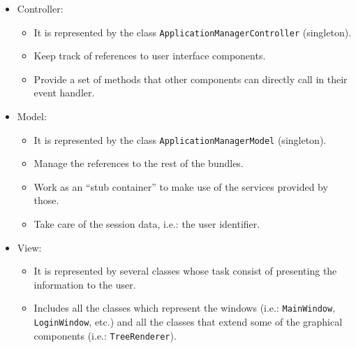 \begin{frame}

\begin{itemize}
	\item Controller: 
	\begin{itemize}
        \item It is represented by the class
        \texttt{ApplicationManagerController} (singleton).
  		\item Keep track of references to user interface components.
  		\item Provide a set of methods that other components can directly call in
  		their event handler.
    \end{itemize}
    
 	\item Model:
		\begin{itemize}
	        \item It is represented by the class
	        \texttt{ApplicationManagerModel} (singleton).
	  		\item Manage the references to the rest of the bundles.
	  		\item Work as an ``stub container'' to make use of the services provided
	  		by those.
	  		\item Take care of the session data, i.e.: the user identifier.
	    \end{itemize}
    
    \item View: 
		\begin{itemize}
	        \item It is represented by several classes whose task consist of
    			presenting the information to the user.
	  		\item Includes all the classes which represent the windows (i.e.:
	  		\texttt{MainWindow}, \texttt{LoginWindow}, etc.) and all the classes that
	  		extend some of the graphical components (i.e.: \texttt{TreeRenderer}).
	  	\end{itemize} 
\end{itemize}

\end{frame}


% 
% 
